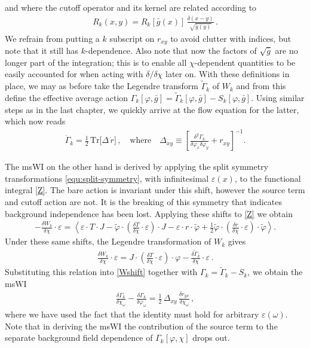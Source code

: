\documentclass[11pt]{book} %
\numberwithin{equation}{chapter}
\begin{document}
and where the cutoff operator and its kernel are related according to
\begin{align}
  R_k(x,y) = R_{k}[\bar g(x)] \, \frac{\delta(x-y)}{\sqrt{\bar g(y)}} \,.
\end{align}
We refrain from putting a $k$ subscript on $r_{xy}$ to avoid clutter with indices,
but note that it still has $k$-dependence. Also note that now the factors of $\sqrt{\bar g}$ are no
longer part of the integration; this is to enable all $\chi$-dependent quantities to be easily accounted
for when acting with $\delta/\delta\chi$ later on.
With these definitions in place, we may as before take the Legendre transform $\tilde\Gamma_{k}$ of $W_k$
and from this define the effective average action
$ \Gamma_k[\varphi,\bar g]=\tilde\Gamma_k[\varphi,\bar g]-S_k[\varphi,\bar g]$.
Using similar steps as in the last chapter, we quickly arrive at the flow equation
for the latter, which now reads
\begin{align}
  \dot \Gamma_k =
  \frac{1}{2} \, \mathrm{Tr} \big[ \Delta \, \dot r \big] \,,
  \quad \text{where} \quad
  \Delta_{xy}\equiv\left[\frac{\delta^{2}\Gamma_k}{\delta\varphi_x \delta\varphi_y}+r_{xy}\right]^{-1} .
  \label{flow1}
\end{align}

The msWI on the other hand is derived by applying the
split symmetry transformations \eqref{equ:split-symmetry},
with infinitesimal $\varepsilon(x)$, to the functional integral \eqref{Z}.
The bare action is invariant under this shift, however the source term and cutoff action are not.
It is the breaking of this symmetry that indicates background independence has been lost.
Applying these shifts to \eqref{Z} we obtain
\begin{align}
	-\frac{\delta W_k}{\delta\chi}\cdot\varepsilon=\left< \varepsilon\cdot T\cdot J-
	\tilde\varphi\cdot\left(\frac{\delta T}{\delta\chi}\cdot\varepsilon\right)\cdot J
	- \varepsilon\cdot r\cdot\tilde\varphi
	+\frac{1}{2}\tilde\varphi\cdot\left(\frac{\delta r}{\delta\chi}\cdot\varepsilon\right)\cdot\tilde\varphi\right>.
	\label{Wshift}
\end{align}
Under these same shifts, the Legendre transformation of $W_k$ gives
\begin{align}
	\frac{\delta W_k}{\delta\chi}\cdot\varepsilon
	= J\cdot\left(\frac{\delta T}{\delta\chi}\cdot\varepsilon\right)\cdot\varphi
	- \frac{\delta\tilde\Gamma_k}{\delta\chi}\cdot\varepsilon \,.
\end{align}
Substituting this relation into \eqref{Wshift} together with
$\Gamma_k=\tilde\Gamma_k-S_k$,
we obtain the msWI
\begin{align}
	\frac{\delta \Gamma_k}{\delta\chi_\omega}-\frac{\delta \Gamma_k}{\delta\varphi_\omega}=
	\frac{1}{2} \, \Delta_{xy}\,\frac{\delta r_{yx}}{\delta\chi_\omega} \,,
	\label{msWIuntrunc}
\end{align}
where we have used the fact that the identity must hold for arbitrary $\varepsilon(\omega)$.
Note that in deriving the msWI the contribution of the source term to the separate background
field dependence of $\Gamma_k[\varphi,\chi]$ drops out.
\end{document}
